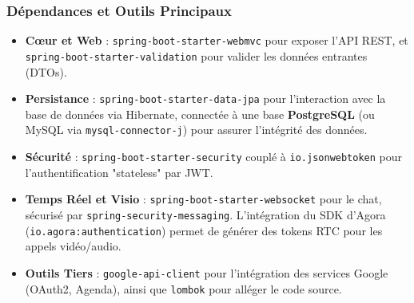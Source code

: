\subsubsection{Dépendances et Outils Principaux}
\begin{itemize}
    \item \textbf{Cœur et Web} : \texttt{spring-boot-starter-webmvc} pour exposer l'API REST, et \texttt{spring-boot-starter-validation} pour valider les données entrantes (DTOs).
    \item \textbf{Persistance} : \texttt{spring-boot-starter-data-jpa} pour l'interaction avec la base de données via Hibernate, connectée à une base \textbf{PostgreSQL} (ou MySQL via \texttt{mysql-connector-j}) pour assurer l'intégrité des données.
    \item \textbf{Sécurité} : \texttt{spring-boot-starter-security} couplé à \texttt{io.jsonwebtoken} pour l'authentification "stateless" par JWT.
    \item \textbf{Temps Réel et Visio} : \texttt{spring-boot-starter-websocket} pour le chat, sécurisé par \texttt{spring-security-messaging}. L'intégration du SDK d'Agora (\texttt{io.agora:authentication}) permet de générer des tokens RTC pour les appels vidéo/audio.
    \item \textbf{Outils Tiers} : \texttt{google-api-client} pour l'intégration des services Google (OAuth2, Agenda), ainsi que \texttt{lombok} pour alléger le code source.
\end{itemize}

